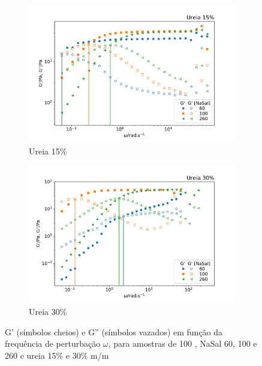 	\begin{figure}[h]
	\begin{subfigure}[t]{0.5\textwidth}
		\centering
		\includegraphics[width=\textwidth]{imagens/reologia/oscilatorio_ur15p}
		\caption{Ureia 15\%}
		\label{fig:oscilatorio_ur_15p}
	\end{subfigure} %
	\begin{subfigure}[t]{0.5\textwidth}
		\centering
		\includegraphics[width=\textwidth]{imagens/reologia/oscilatorio_ur30p}
		\caption{Ureia 30\%}
		\label{fig:oscilatorio_ur_30p}
	\end{subfigure} %
	\caption{G' (símbolos cheios) e G'' (símbolos vazados) em função da frequência de perturbação \(\omega\), para amostras de \CTAB{} 100 \mM{}, NaSal 60, 100 e 260 \mM{} e ureia 15\% e 30\% m/m}
	\label{fig:oscilatorio_ur}
	\end{figure} 	

